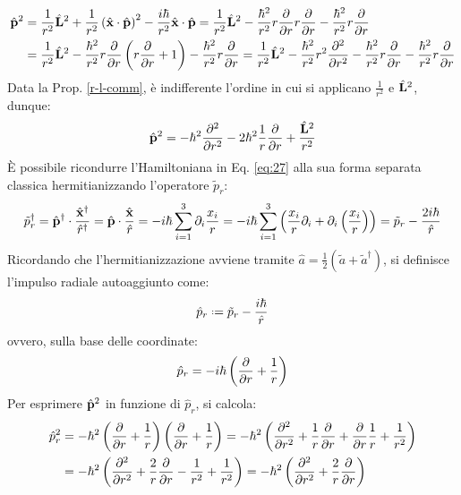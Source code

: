 \begin{equation*}
	\begin{split}
		\hat{\mathbf{p}}^2
		&= \frac{1}{r^2} \hat{\mathbf{L}}^2 + \frac{1}{r^2} \left( \hat{\mathbf{x}}\cdot\hat{\mathbf{p}} \right)^2 - \frac{i\hbar}{r^2} \hat{\mathbf{x}}\cdot\hat{\mathbf{p}} = \frac{1}{r^2} \hat{\mathbf{L}}^2 - \frac{\hbar^2}{r^2} r \frac{\partial}{\partial r} r \frac{\partial}{\partial r} - \frac{\hbar^2}{r^2} r \frac{\partial}{\partial r}\\
		&= \frac{1}{r^2} \hat{\mathbf{L}}^2 - \frac{\hbar^2}{r^2} r \frac{\partial}{\partial r} \left( r \frac{\partial}{\partial r} + 1 \right) - \frac{\hbar^2}{r^2} r \frac{\partial}{\partial r} = \frac{1}{r^2} \hat{\mathbf{L}}^2 - \frac{\hbar^2}{r^2} r^2 \frac{\partial^2}{\partial r^2} - \frac{\hbar^2}{r^2} r \frac{\partial}{\partial r} - \frac{\hbar^2}{r^2} r \frac{\partial}{\partial r}
	\end{split}
\end{equation*}
Data la Prop. \ref{r-l-comm}, è indifferente l'ordine in cui si applicano $ \frac{1}{r^2} $ e $ \hat{\mathbf{L}}^2 $, dunque:
\begin{equation}
	\hat{\mathbf{p}}^2 = -\hbar^2 \frac{\partial^2}{\partial r^2} - 2\hbar^2 \frac{1}{r} \frac{\partial}{\partial r} + \frac{\hat{\mathbf{L}}^2}{r^2}
	\label{eq:1.33}
\end{equation}
È possibile ricondurre l'Hamiltoniana in Eq. \ref{eq:27} alla sua forma separata classica hermitianizzando l'operatore $ \tilde{p}_r $:
\begin{equation*}
	\tilde{p}^{\dagger}_r = \hat{\mathbf{p}}^{\dagger} \cdot \frac{\hat{\mathbf{x}}^{\dagger}}{\hat{r}^{\dagger}} = \hat{\mathbf{p}} \cdot \frac{\hat{\mathbf{x}}}{\hat{r}} = -i\hbar \sum_{i = 1}^{3} \partial_i \frac{x_i}{r} = - i\hbar \sum_{i = 1}^{3} \left( \frac{x_i}{r} \partial_i + \partial_i \left( \frac{x_i}{r} \right) \right) = \tilde{p}_r - \frac{2i\hbar}{\hat{r}}
\end{equation*}
Ricordando che l'hermitianizzazione avviene tramite $ \hat{a} = \frac{1}{2} (\tilde{a} + \tilde{a}^{\dagger}) $, si definisce l'impulso radiale autoaggiunto come:
\begin{equation}
	\hat{p}_r \defeq \tilde{p}_r - \frac{i\hbar}{\hat{r}}
	\label{eq:1.34}
\end{equation}
ovvero, sulla base delle coordinate:
\begin{equation}
	\hat{p}_r = -i\hbar \left( \frac{\partial}{\partial r} + \frac{1}{r} \right)
	\label{eq:1.35}
\end{equation}
Per esprimere $ \hat{\mathbf{p}}^2 $ in funzione di $ \hat{p}_r $, si calcola:
\begin{equation*}
	\begin{split}
		\hat{p}^2_r
		&= -\hbar^2 \left( \frac{\partial}{\partial r} + \frac{1}{r} \right) \left( \frac{\partial}{\partial r} + \frac{1}{r} \right) = -\hbar^2 \left( \frac{\partial^2}{\partial r^2} + \frac{1}{r} \frac{\partial}{\partial r} + \frac{\partial}{\partial r} \frac{1}{r} + \frac{1}{r^2} \right)\\
		&= -\hbar^2 \left( \frac{\partial^2}{\partial r^2} + \frac{2}{r} \frac{\partial}{\partial r} - \frac{1}{r^2} + \frac{1}{r^2} \right) = -\hbar^2 \left( \frac{\partial^2}{\partial r^2} + \frac{2}{r} \frac{\partial}{\partial r} \right)
	\end{split}
\end{equation*}
